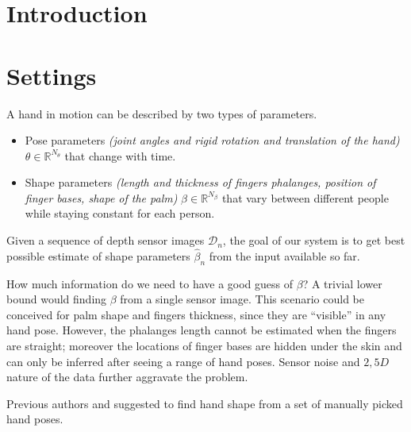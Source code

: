 \section{Introduction}
\section{Settings}
A hand in motion can be described by two types of parameters.
\begin{itemize}
\item Pose parameters \textit{(joint angles and rigid rotation and translation of the hand)} $\theta \in \mathbb{R}^{N_{\theta}}$ that change with time. 
\item Shape parameters \textit{(length and thickness of fingers phalanges, position of finger bases, shape of the palm)} $\beta \in \mathbb{R}^{N_{\beta}}$ that vary between different people while staying constant for each person. 
\end{itemize}
Given a sequence of depth sensor images $\mathcal{D}_n$, the goal of our system is to get best possible estimate of shape parameters $\hat{\beta}_n$ from the input available so far.

How much information do we need to have a good guess of $\beta$? A trivial lower bound would finding $\beta$ from a single sensor image. This scenario could be conceived for palm shape and fingers thickness, since they are ``visible'' in any hand pose. However, the phalanges length cannot be estimated when the fingers are straight; moreover the locations of finger bases are hidden under the skin and can only be inferred after seeing a range of hand poses. Sensor noise and $2,5 D$ nature of the data further aggravate the problem. 

Previous authors \cite{joseph2016fits} and \cite{tkach2016sphere} suggested to find hand shape from a set of manually picked hand poses. 


